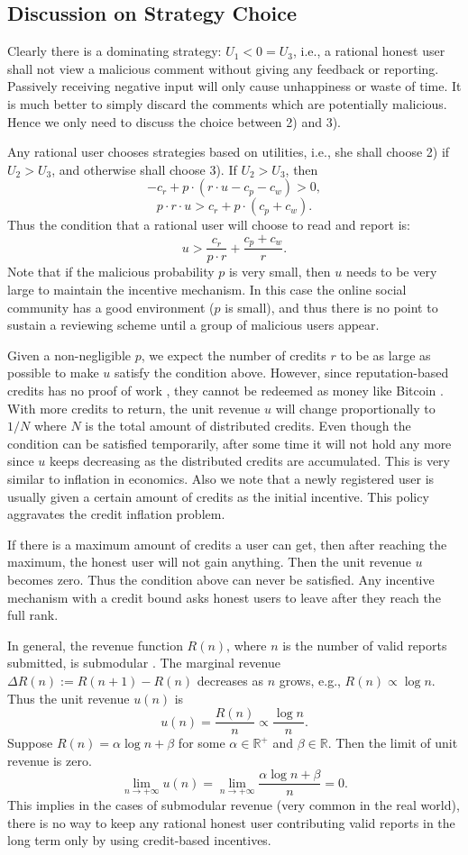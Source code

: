 \documentclass[12pt]{article}
\begin{document}
\subsection{Discussion on Strategy Choice}
Clearly there is a dominating strategy: $U_1 < 0 = U_3$, i.e., a rational honest user shall not view a malicious comment without giving any feedback or reporting. Passively receiving negative input will only cause unhappiness or waste of time. It is much better to simply discard the comments which are potentially malicious. Hence we only need to discuss the choice between 2) and 3).

Any rational user chooses strategies based on utilities, i.e., she shall choose 2) if $U_2 > U_3$, and otherwise shall choose 3). If $U_2 > U_3$, then
$$-c_r + p\cdot(r\cdot u -c_p-c_w) > 0,$$
$$p\cdot r\cdot u > c_r+p\cdot(c_p+c_w).$$
Thus the condition that a rational user will choose to read and report is:
$$u > \frac{c_r}{p\cdot r} + \frac{c_p+c_w}{r}.$$
Note that if the malicious probability $p$ is very small, then $u$ needs to be very large to maintain the incentive mechanism. In this case the online social community has a good environment ($p$ is small), and thus there is no point to sustain a reviewing scheme until a group of malicious users appear.

Given a non-negligible $p$, we expect the number of credits $r$ to be as large as possible to make $u$ satisfy the condition above. However, since reputation-based credits has no proof of work \cite{PoW}, they cannot be redeemed as money like Bitcoin \cite{BCoin}. With more credits to return, the unit revenue $u$ will change proportionally to $1/N$ where $N$ is the total amount of distributed credits. Even though the condition can be satisfied temporarily, after some time it will not hold any more since $u$ keeps decreasing as the distributed credits are accumulated. This is very similar to inflation in economics. Also we note that a newly registered user is usually given a certain amount of credits as the initial incentive. This policy aggravates the credit inflation problem.

If there is a maximum amount of credits a user can get, then after reaching the maximum, the honest user will not gain anything. Then the unit revenue $u$ becomes zero. Thus the condition above can never be satisfied. Any incentive mechanism with a credit bound asks honest users to leave after they reach the full rank.

In general, the revenue function $R(n)$, where $n$ is the number of valid reports submitted, is submodular \cite{RS09}. The marginal revenue $\Delta R(n) := R(n+1)-R(n)$ decreases as $n$ grows, e.g., $R(n) \propto \log{n}$. Thus the unit revenue $u(n)$ is
$$u(n) = \frac{R(n)}{n} \propto \frac{\log{n}}{n}.$$
Suppose $R(n) = \alpha\log{n}+\beta$ for some $\alpha\in\mathbb{R}^+$ and $\beta\in\mathbb{R}$. Then the limit of unit revenue is zero.
$$\lim_{n\to +\infty}u(n) = \lim_{n\to +\infty}\frac{\alpha\log{n}+\beta}{n} = 0.$$
This implies in the cases of submodular revenue (very common in the real world), there is no way to keep any rational honest user contributing valid reports in the long term only by using credit-based incentives.
\end{document}

